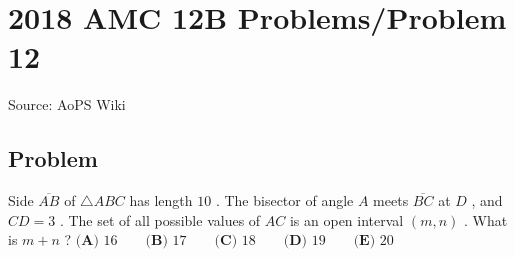 \documentclass[12pt]{article}
\begin{document}
\section*{{2018 AMC 12B Problems/Problem 12}}
Source: AoPS Wiki

\subsection*{Problem}
Side $\overline{AB}$ of $\triangle ABC$ has length $10$ . The bisector of angle $A$ meets $\overline{BC}$ at $D$ , and $CD = 3$ . The set of all possible values of $AC$ is an open interval $(m,n)$ . What is $m+n$ ? $\textbf{(A) }16 \qquad \textbf{(B) }17 \qquad \textbf{(C) }18 \qquad \textbf{(D) }19 \qquad \textbf{(E) }20 \qquad$
\end{document}
